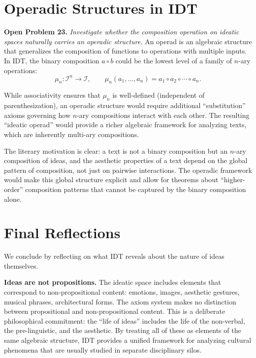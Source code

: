 \documentclass[11pt,openany]{book}
\theoremstyle{definition}
\theoremstyle{plain}
\theoremstyle{remark}
\newcommand{\IS}{\mathcal{I}}               %
\newcommand{\compose}{\circ}                 %
\begin{document}
\section{Operadic Structures in IDT}

\textbf{Open Problem 23.} \emph{Investigate whether the composition operation on ideatic spaces naturally carries an operadic structure.} An operad is an algebraic structure that generalizes the composition of functions to operations with multiple inputs. In IDT, the binary composition $a \compose b$ could be the lowest level of a family of $n$-ary operations:
\[
\mu_n : \IS^n \to \IS, \qquad \mu_n(a_1, \ldots, a_n) = a_1 \compose a_2 \compose \cdots \compose a_n.
\]

While associativity ensures that $\mu_n$ is well-defined (independent of parenthesization), an operadic structure would require additional ``substitution'' axioms governing how $n$-ary compositions interact with each other. The resulting ``ideatic operad'' would provide a richer algebraic framework for analyzing texts, which are inherently multi-ary compositions.

The literary motivation is clear: a text is not a binary composition but an $n$-ary composition of ideas, and the aesthetic properties of a text depend on the global pattern of composition, not just on pairwise interactions. The operadic framework would make this global structure explicit and allow for theorems about ``higher-order'' composition patterns that cannot be captured by the binary composition alone.

\section{Final Reflections}

We conclude by reflecting on what IDT reveals about the nature of ideas themselves.

\textbf{Ideas are not propositions.} The ideatic space includes elements that correspond to non-propositional content: emotions, images, aesthetic gestures, musical phrases, architectural forms. The axiom system makes no distinction between propositional and non-propositional content. This is a deliberate philosophical commitment: the ``life of ideas'' includes the life of the non-verbal, the pre-linguistic, and the aesthetic. By treating all of these as elements of the same algebraic structure, IDT provides a unified framework for analyzing cultural phenomena that are usually studied in separate disciplinary silos.
\end{document}
